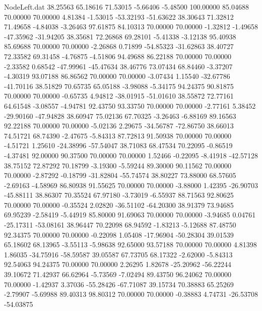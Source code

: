 \begin{filecontents}{NodeLeft.dat}
  38.25563   65.18616   71.53015    -5.66406   -5.48500  100.00000   85.04688   70.00000   70.00000    4.81384   -1.53015  -53.32193  -51.63622
  38.30643   71.32812   71.49658    -4.84038   -3.26463   97.61875   84.10313   70.00000   70.00000   -1.32812   -1.49658  -47.35962  -31.94205
  38.35681   72.26868   69.28101    -5.41338   -3.12138   95.40938   85.69688   70.00000   70.00000   -2.26868    0.71899  -54.85323  -31.62863
  38.40727   72.33582   69.31458    -4.76875   -4.51806   94.49688   86.22188   70.00000   70.00000   -2.33582    0.68542  -47.99961  -45.47634
  38.46776   73.07434   68.84460    -3.37207   -4.30319   93.07188   86.86562   70.00000   70.00000   -3.07434    1.15540  -32.67786  -41.70116
  38.51829   70.65735   65.05188    -3.98088   -5.34175   94.24375   90.81875   70.00000   70.00000   -0.65735    4.94812  -38.01915  -51.01610
  38.55872   72.77161   64.61548    -3.08557   -4.94781   92.43750   93.33750   70.00000   70.00000   -2.77161    5.38452  -29.90160  -47.94828
  38.60947   75.02136   67.70325    -3.26463   -6.88169   89.16563   92.22188   70.00000   70.00000   -5.02136    2.29675  -34.56787  -72.86750
  38.66013   74.51721   68.74390    -2.47675   -5.84313   87.72813   91.50938   70.00000   70.00000   -4.51721    1.25610  -24.38996  -57.54047
  38.71083   68.47534   70.22095    -0.86519   -4.37481   92.00000   90.37500   70.00000   70.00000    1.52466   -0.22095   -8.41918  -42.57128
  38.75152   72.87292   70.18799    -3.19300   -5.59244   89.30000   90.11562   70.00000   70.00000   -2.87292   -0.18799  -31.82804  -55.74574
  38.80227   73.88000   68.57605    -2.69163   -4.58969   86.80938   91.55625   70.00000   70.00000   -3.88000    1.42395  -26.90703  -45.88111
  38.86307   70.35524   67.97180    -3.73019   -6.55937   88.71563   92.80625   70.00000   70.00000   -0.35524    2.02820  -36.51102  -64.20300
  38.91379   73.94685   69.95239    -2.58419   -5.44919   85.80000   91.69063   70.00000   70.00000   -3.94685    0.04761  -25.17311  -53.08161
  38.96447   70.22098   68.94592    -1.83213   -5.12688   87.48750   92.34375   70.00000   70.00000   -0.22098    1.05408  -17.96904  -50.28304
  39.01539   65.18602   68.13965    -3.55113   -5.98638   92.65000   93.57188   70.00000   70.00000    4.81398    1.86035  -34.75916  -58.59587
  39.05587   67.73705   68.17322    -2.62000   -5.84313   92.54063   94.24375   70.00000   70.00000    2.26295    1.82678  -25.20962  -56.22244
  39.10672   71.42937   66.62964    -5.73569   -7.02494   89.43750   96.24062   70.00000   70.00000   -1.42937    3.37036  -55.28426  -67.71087
  39.15734   70.38883   65.25269    -2.79907   -5.69988   89.40313   98.80312   70.00000   70.00000   -0.38883    4.74731  -26.53708  -54.03875

\end{filecontents}
